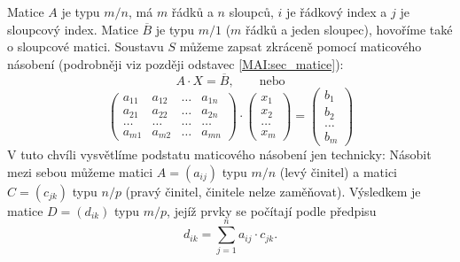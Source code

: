 {      Matice \(A\) je typu \(m/n\), má \(m\) řádků a \(n\) sloupců, \(i\) je řádkový index a \(j\) 
      je sloupcový index. Matice \(\overline{B}\) je typu \(m/1\) (\(m\) řádků a jeden sloupec), 
      hovoříme také o sloupcové matici. Soustavu \(S\) můžeme zapsat zkráceně pomocí maticového 
      násobení (podrobněji viz později odstavec \ref{MAI:sec_matice}):
      \begin{equation*}
        A \cdot X = \overline{B}, \qquad \text{nebo}
      \end{equation*}  
      \begin{equation}\label{mai:eq004}
          \begin{pmatrix}
            a_{11} & a_{12} & \ldots & a_{1n} \\
            a_{21} & a_{22} & \ldots & a_{2n} \\
            \ldots & \ldots & \ldots & \ldots \\
            a_{m1} & a_{m2} & \ldots & a_{mn}
          \end{pmatrix}
          \cdot
          \begin{pmatrix}
            x_1     \\
            x_2     \\
            \ldots  \\
            x_m 
         \end{pmatrix}
          =
         \begin{pmatrix}
              b_1     \\
              b_2     \\
              \ldots  \\
              b_m 
            \end{pmatrix}
      \end{equation}
      V tuto chvíli vysvětlíme podstatu maticového násobení jen technicky: Násobit mezi sebou 
      můžeme matici \(A = (a_{ij})\) typu \(m/n\) (levý činitel) a matici \(C = (c_{jk})\) typu 
      \(n/p\) (pravý činitel, činitele nelze zaměňovat). Výsledkem je matice \(D = (d_{ik})\) typu 
      \(m/p\), jejíž prvky se počítají podle předpisu
      \begin{equation}\label{mai:eq005}
        d_{ik} = \sum_{j=1}^{n} a_{ij}\cdot c_{jk}.
      \end{equation}
      
}
